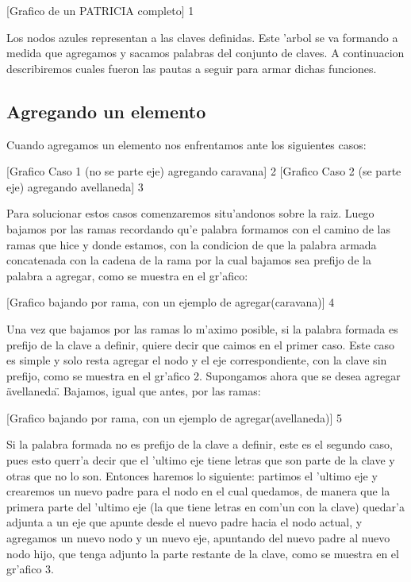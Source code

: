 [Grafico de un PATRICIA completo] 1

Los nodos azules representan a las claves definidas. Este 'arbol se va formando a medida que agregamos y sacamos palabras del conjunto de claves. A continuacion describiremos cuales fueron las pautas a seguir para armar dichas funciones.

\subsection{Agregando un elemento}
Cuando agregamos un elemento nos enfrentamos ante los siguientes casos:

[Grafico Caso 1 (no se parte eje) agregando caravana] 2
[Grafico Caso 2 (se parte eje) agregando avellaneda] 3

Para solucionar estos casos comenzaremos situ'andonos sobre la raiz. Luego bajamos por las ramas recordando qu'e palabra formamos con el camino de las 
ramas que hice y donde estamos, con la condicion de que la palabra armada concatenada con la cadena de la rama por la cual bajamos sea prefijo de la palabra a agregar, como se muestra en el gr'afico:

[Grafico bajando por rama, con un ejemplo de agregar(caravana)] 4

Una vez que bajamos por las ramas lo m'aximo posible, si la palabra formada es prefijo de la clave a definir, quiere decir que caimos en el primer caso. Este caso es simple y solo resta agregar el nodo y el eje correspondiente, con la clave sin prefijo, como se muestra en el gr'afico 2.
Supongamos ahora que se desea agregar \"avellaneda\". Bajamos, igual que antes, por las ramas:

[Grafico bajando por rama, con un ejemplo de agregar(avellaneda)] 5

Si la palabra formada no es prefijo de la clave a definir, este es el segundo caso, pues esto querr'a decir que el 'ultimo eje tiene letras que son parte de la clave y otras que no lo son. Entonces haremos lo siguiente: partimos el 'ultimo eje y crearemos un nuevo padre para el nodo en el cual quedamos, de manera que la primera parte del 'ultimo eje (la que tiene letras en com'un con la clave) quedar'a adjunta a un eje que apunte desde el nuevo padre hacia el nodo actual, y agregamos un nuevo nodo y un nuevo eje, apuntando del nuevo padre al nuevo nodo hijo, que tenga adjunto la parte restante de la clave, como se muestra en el gr'afico 3.

